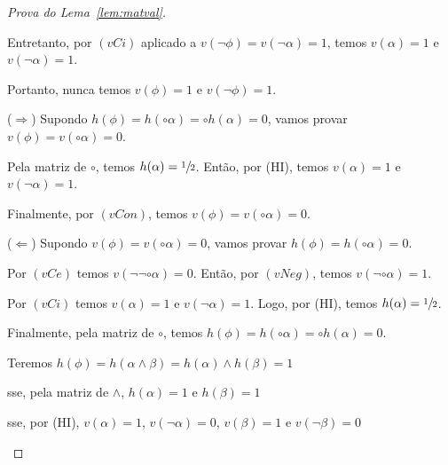 \begin{proof}[Prova do Lema~\ref{lem:matval}]
\begin{provaporcasos}
\begin{provaporsubcasos}
                        Entretanto, por $(vCi)$ aplicado a $v(\neg \phi) = v(\neg \alpha) = 1$, temos $v(\alpha) = 1$ e $v(\neg \alpha) = 1$.

                        Portanto, nunca temos $v(\phi) = 1$ e $v(\neg \phi) = 1$.

                        
                    

                        ($\Longrightarrow$) Supondo $h(\phi) = h(\circ \alpha) = \circ h(\alpha) = 0$, vamos provar $v(\phi) = v(\circ \alpha) = 0$.

                        Pela matriz de $\circ$, temos $h(\alpha) = \sfrac{1}{2}{}$. Então, por (HI), temos $v(\alpha) = 1$ e $v(\neg \alpha) = 1$. 
                        
                        Finalmente, por $(vCon)$, temos $v(\phi) = v(\circ \alpha) = 0$.
                    
                        ($\Longleftarrow$) Supondo $v(\phi) = v(\circ \alpha) = 0$, vamos provar $h(\phi) = h(\circ \alpha) = 0$.

                        Por $(vCe)$ temos $v(\neg \neg \circ \alpha) = 0$. Então, por $(vNeg)$, temos $v(\neg \circ \alpha) = 1$.

                        Por $(vCi)$ temos $v(\alpha) = 1$ e $v(\neg \alpha) = 1$. Logo, por (HI), temos $h(\alpha) = \sfrac{1}{2}{}$.

                        Finalmente, pela matriz de $\circ$, temos $h(\phi) = h(\circ \alpha) = \circ h(\alpha) = 0$.
                    
            \end{provaporsubcasos}
        

            \begin{provaporsubcasos}

                    Teremos $h(\phi) = h(\alpha \land \beta) = h(\alpha) \land h(\beta) = 1$

                    \qquad{}sse, pela matriz de $\land$, $h(\alpha) = 1$ e $h(\beta) = 1$

                    \qquad{}sse, por (HI), $v(\alpha) = 1$, $v(\neg \alpha) = 0$, $v(\beta) = 1$ e $v(\neg \beta) = 0$


\end{provaporsubcasos}
\end{provaporcasos}
\end{proof}
